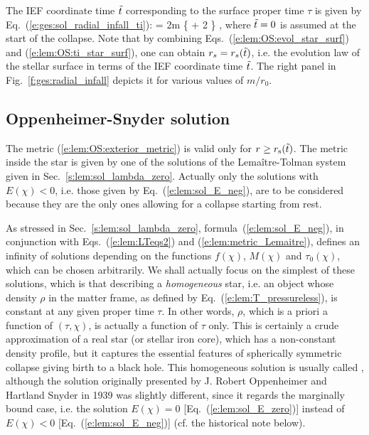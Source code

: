 The IEF coordinate time ${\tilde t}$ corresponding to the surface proper time $\tau$
is given by Eq.~(\ref{e:ges:sol_radial_infall_ti}):
\be \label{e:lem:OS:ti_star_surf}
     \ti = 2m \left\{  
    +  2 \ln {} \right\}  ,
\ee
where ${\tilde t} = 0$ is assumed at the start of the collapse.
Note that by combining Eqs.~(\ref{e:lem:OS:evol_star_surf}) and (\ref{e:lem:OS:ti_star_surf}),
one can obtain $r_s = r_s({\tilde t})$, i.e. the evolution law of the stellar surface
in terms of the IEF coordinate time ${\tilde t}$.
The right panel in Fig.~\ref{f:ges:radial_infall}
depicts it for various values of $m/r_0$.


\subsection{Oppenheimer-Snyder solution} \label{s:lem:OS_sol}

The metric (\ref{e:lem:OS:exterior_metric}) is valid only for $r \geq r_{\rm s}({\tilde t})$.
The metric inside the star is given by one of the solutions
of the Lemaître-Tolman system given in Sec.~\ref{s:lem:sol_lambda_zero}.
Actually only the solutions with $E(\chi)<0$, i.e. those given by Eq.~(\ref{e:lem:sol_E_neg}),
are to be considered because they are the only ones allowing for a collapse starting
from rest.

As stressed in Sec.~\ref{s:lem:sol_lambda_zero}, formula~(\ref{e:lem:sol_E_neg}),
in conjunction with Eqs.~(\ref{e:lem:LTeqs2}) and
(\ref{e:lem:metric_Lemaitre}),
defines an infinity of solutions depending on the functions
$f(\chi)$, $M(\chi)$ and $\tau_0(\chi)$, which can be chosen arbitrarily.
We shall actually focus on the simplest of these solutions, which is that
describing a \emph{homogeneous} star, i.e. an object whose density
$\rho$ in the matter frame, as defined by Eq.~(\ref{e:lem:T_pressureless}),
is constant at any given proper time $\tau$. In other words, $\rho$, which
is a priori a function of $(\tau,\chi)$, is actually a function of $\tau$ only.
This is certainly a crude approximation of a real star (or stellar iron core),
which has a non-constant density profile, but it captures the essential
features of spherically symmetric collapse giving birth to a black hole.
This homogeneous solution is usually called
,
although the solution originally presented by J. Robert Oppenheimer
and Hartland Snyder in 1939 \cite{OppenS1939} was slightly
different, since it regards the marginally bound case, i.e. the solution $E(\chi) = 0$
[Eq.~(\ref{e:lem:sol_E_zero})] instead of $E(\chi)<0$ [Eq.~(\ref{e:lem:sol_E_neg})]
(cf. the historical note below).



